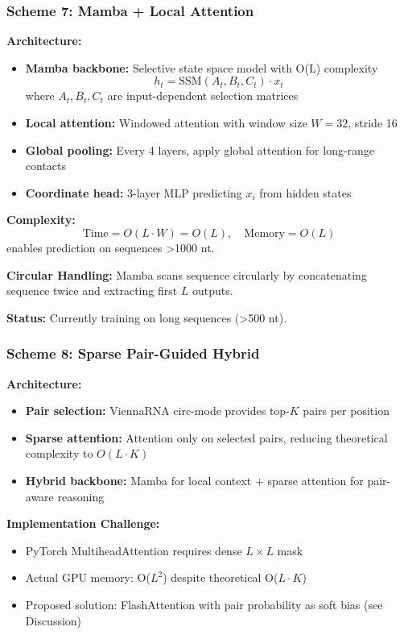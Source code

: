\documentclass[12pt]{article}
\begin{document}
\subsubsection{Scheme 7: Mamba + Local Attention}

\textbf{Architecture:}
\begin{itemize}
\item \textbf{Mamba backbone:} Selective state space model with O(L) complexity
\begin{equation}
h_t = \text{SSM}(A_t, B_t, C_t) \cdot x_t
\end{equation}
where $A_t, B_t, C_t$ are input-dependent selection matrices
\item \textbf{Local attention:} Windowed attention with window size $W=32$, stride 16
\item \textbf{Global pooling:} Every 4 layers, apply global attention for long-range contacts
\item \textbf{Coordinate head:} 3-layer MLP predicting $x_i$ from hidden states
\end{itemize}

\textbf{Complexity:}
\begin{equation}
\text{Time} = O(L \cdot W) = O(L), \quad \text{Memory} = O(L)
\end{equation}
enables prediction on sequences >1000 nt.

\textbf{Circular Handling:} Mamba scans sequence circularly by concatenating sequence twice and extracting first $L$ outputs.

\textbf{Status:} Currently training on long sequences (>500 nt).

\subsubsection{Scheme 8: Sparse Pair-Guided Hybrid}

\textbf{Architecture:}
\begin{itemize}
\item \textbf{Pair selection:} ViennaRNA circ-mode provides top-$K$ pairs per position
\item \textbf{Sparse attention:} Attention only on selected pairs, reducing theoretical complexity to $O(L \cdot K)$
\item \textbf{Hybrid backbone:} Mamba for local context + sparse attention for pair-aware reasoning
\end{itemize}

\textbf{Implementation Challenge:}
\begin{itemize}
\item PyTorch MultiheadAttention requires dense $L \times L$ mask
\item Actual GPU memory: O($L^2$) despite theoretical O($L \cdot K$)
\item Proposed solution: FlashAttention with pair probability as soft bias (see Discussion)
\end{itemize}
\end{document}
